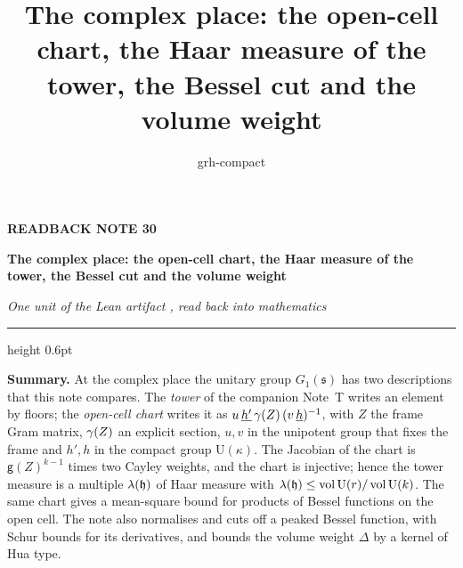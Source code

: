 \documentclass[11pt,a4paper]{article}
\title{The complex place: the open-cell chart, the Haar measure of the tower, the Bessel cut and the volume weight}
\author{grh-compact}
\date{}
\theoremstyle{plainx}
\theoremstyle{uprightx}
\newcommand{\vol}{\operatorname{vol}}
\newcommand{\Gone}[1]{G_1(#1)}
\newcommand{\volU}[1]{\vol\mathrm{U}(#1)}
\newcommand{\emb}[1]{\underline{#1}}
\newcommand{\gd}[1]{\mathsf{g}(#1)}
\begin{document}
\color{ink}

{\raggedright
{\sffamily\bfseries\fontsize{7.2}{9}\selectfont\color{leancol}READBACK NOTE 30\par}
\vspace{5pt}
{\fontsize{21.5}{25.5}\selectfont\bfseries The complex place: the open-cell chart, the Haar measure of the tower, the Bessel cut and the volume weight\par}
\vspace{5pt}
{\fontsize{12.4}{16}\selectfont\itshape\color{inksoft} One unit of the Lean artifact \ArtifactName, read back into
mathematics\par}}
\vspace{8pt}
{\color{rulegrey}\hrule height 0.6pt}
\vspace{7pt}
\thispagestyle{empty}

\textbf{Summary.} At the complex place the unitary group $\Gone{\mathfrak{s}}$ has two descriptions that this note
compares. The \emph{tower} of the companion Note~T writes an element by floors; the \emph{open-cell chart} writes
it as $u\,\emb{h'}\,\gramSection{Z}\,(v\,\emb{h})^{-1}$, with $Z$ the frame Gram matrix, $\gamma(Z)$ an explicit
section, $u,v$ in the unipotent group that fixes the frame and $h',h$ in the compact group $\mathrm{U}(\kappa)$. The Jacobian of the chart
is $\gd{Z}^{k-1}$ times two Cayley weights, and the chart is injective; hence the tower measure is a multiple
$\lambda(\mathfrak{h})$ of Haar measure with $\haarRatio{\mathfrak{h}}\le\volU{r}/\volU{k}$. The same chart gives a mean-square bound for
products of Bessel functions on the open cell. The note also normalises and cuts off a peaked Bessel function,
with Schur bounds for its derivatives, and bounds the volume weight $\Delta$ by a kernel of Hua type.
\end{document}
